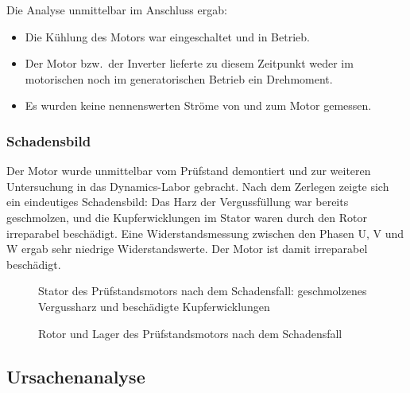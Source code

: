 Die Analyse unmittelbar im Anschluss ergab:
\begin{itemize}
    \item Die Kühlung des Motors war eingeschaltet und in Betrieb.
    \item Der Motor bzw.\ der Inverter lieferte zu diesem Zeitpunkt weder im motorischen noch im generatorischen Betrieb ein Drehmoment.
    \item Es wurden keine nennenswerten Ströme von und zum Motor gemessen.
\end{itemize}

\subsubsection{Schadensbild}
\label{subsec:schadensbild}

Der Motor wurde unmittelbar vom Prüfstand demontiert und zur weiteren Untersuchung in das Dynamics-Labor gebracht. Nach dem Zerlegen zeigte sich ein eindeutiges Schadensbild: Das Harz der Vergussfüllung war bereits geschmolzen, und die Kupferwicklungen im Stator waren durch den Rotor irreparabel beschädigt. Eine Widerstandsmessung zwischen den Phasen U, V und W ergab sehr niedrige Widerstandswerte. Der Motor ist damit irreparabel beschädigt.

\begin{figure}[htbp]
    \centering
    \caption{Stator des Prüfstandsmotors nach dem Schadensfall: geschmolzenes Vergussharz und beschädigte Kupferwicklungen}
    \label{fig:schaden_stator}
\end{figure}

\begin{figure}[htbp]
    \centering
    \caption{Rotor und Lager des Prüfstandsmotors nach dem Schadensfall}
    \label{fig:schaden_rotor_lager}
\end{figure}


\subsection{Ursachenanalyse}
\label{sec:ursachenanalyse}

